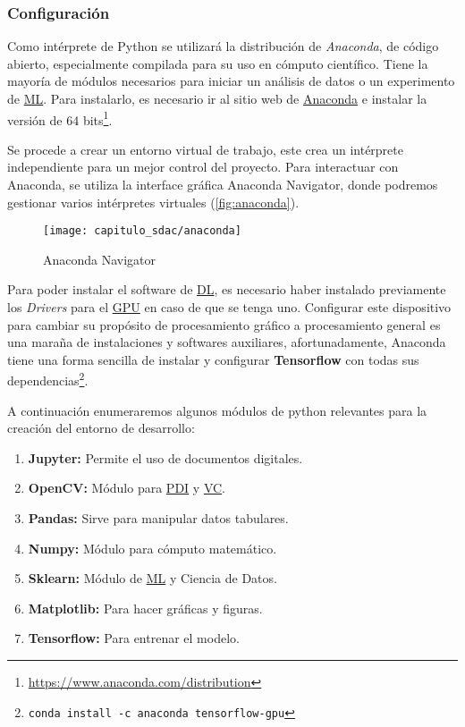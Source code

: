 \subsubsection{Configuración}

Como intérprete de Python se utilizará la distribución de \emph{Anaconda}, de
código abierto, especialmente compilada para su uso en cómputo científico. Tiene
la mayoría de módulos necesarios para iniciar un análisis de datos o un
experimento de \hyperlink{abbr}{ML}. Para instalarlo, es necesario ir al sitio
web de \href{https://www.anaconda.com/distribution/}{Anaconda} e instalar la
versión de 64
bits\footnote{\url{https://www.anaconda.com/distribution}}.

Se procede a crear un entorno virtual de trabajo, este crea un intérprete
independiente para un mejor control del proyecto. Para interactuar con Anaconda,
se utiliza la interface gráfica Anaconda Navigator, donde podremos gestionar
varios intérpretes virtuales (\autoref{fig:anaconda}).

\begin{figure}[H]
    \centering
    \texttt{[image: capitulo\_sdac/anaconda]}
    \caption{Anaconda Navigator}\label{fig:anaconda}
\end{figure}

Para poder instalar el software de \hyperlink{abbr}{DL}, es necesario haber
instalado previamente los \emph{Drivers} para el \hyperlink{abbr}{GPU} en caso
de que se tenga uno. Configurar este dispositivo para cambiar su propósito de
procesamiento gráfico a procesamiento general es una maraña de instalaciones y
softwares auxiliares, afortunadamente, Anaconda tiene una forma sencilla de
instalar y configurar \textbf{Tensorflow} con todas sus
dependencias\footnote{\texttt{conda install -c anaconda
tensorflow-gpu}}.

A continuación enumeraremos algunos módulos de python relevantes para la creación
del entorno de desarrollo:

\begin{enumerate}
    \item{\textbf{Jupyter: }} Permite el uso de documentos digitales.
    \item{\textbf{OpenCV: }} Módulo para \hyperlink{abbr}{PDI} y \hyperlink{abbr}{VC}.
    \item{\textbf{Pandas: }} Sirve para manipular datos tabulares.
    \item{\textbf{Numpy: }} Módulo para cómputo matemático.
    \item{\textbf{Sklearn: }} Módulo de \hyperlink{abbr}{ML} y Ciencia de Datos.
    \item{\textbf{Matplotlib: }} Para hacer gráficas y figuras.
    \item{\textbf{Tensorflow: }} Para entrenar el modelo.
\end{enumerate}

